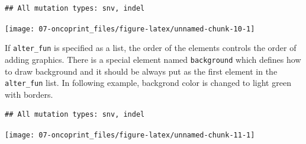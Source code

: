 \documentclass[]{book}
\newenvironment{Shaded}{\begin{snugshade}}{\end{snugshade}}
\newcommand{\KeywordTok}[1]{\textcolor[rgb]{0.13,0.29,0.53}{\textbf{#1}}}
\newcommand{\DataTypeTok}[1]{\textcolor[rgb]{0.13,0.29,0.53}{#1}}
\newcommand{\FloatTok}[1]{\textcolor[rgb]{0.00,0.00,0.81}{#1}}
\newcommand{\StringTok}[1]{\textcolor[rgb]{0.31,0.60,0.02}{#1}}
\newcommand{\OtherTok}[1]{\textcolor[rgb]{0.56,0.35,0.01}{#1}}
\newcommand{\ControlFlowTok}[1]{\textcolor[rgb]{0.13,0.29,0.53}{\textbf{#1}}}
\newcommand{\OperatorTok}[1]{\textcolor[rgb]{0.81,0.36,0.00}{\textbf{#1}}}
\newcommand{\NormalTok}[1]{#1}
\theoremstyle{definition}
\theoremstyle{definition}
\theoremstyle{definition}
\theoremstyle{remark}
\begin{document}
\begin{verbatim}
## All mutation types: snv, indel
\end{verbatim}

\begin{center}\texttt{[image: 07-oncoprint\_files/figure-latex/unnamed-chunk-10-1]} \end{center}

If \texttt{alter\_fun} is specified as a list, the order of the elements
controls the order of adding graphics. There is a special element named
\texttt{background} which defines how to draw background and it should
be always put as the first element in the \texttt{alter\_fun} list. In
following example, backgrond color is changed to light green with
borders.

\begin{Shaded}
\end{Shaded}

\begin{verbatim}
## All mutation types: snv, indel
\end{verbatim}

\begin{center}\texttt{[image: 07-oncoprint\_files/figure-latex/unnamed-chunk-11-1]} \end{center}
\end{document}
